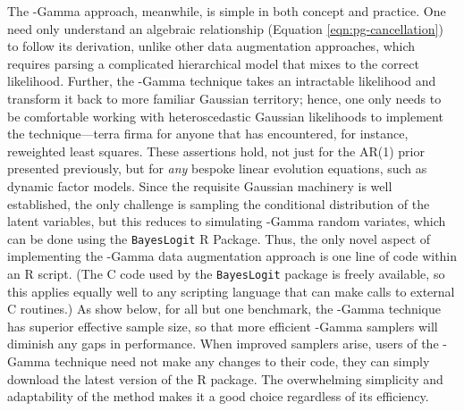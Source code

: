 The \Polya-Gamma approach, meanwhile, is simple in both concept and practice.
One need only understand an algebraic relationship (Equation
\ref{eqn:pg-cancellation}) to follow its derivation, unlike other data
augmentation approaches, which requires parsing a complicated hierarchical model
that mixes to the correct likelihood.  Further, the \Polya-Gamma technique takes
an intractable likelihood and transform it back to more familiar Gaussian
territory; hence, one only needs to be comfortable working with heteroscedastic
Gaussian likelihoods to implement the technique---terra firma for anyone that
has encountered, for instance, reweighted least squares.  These assertions hold,
not just for the AR(1) prior presented previously, but for \emph{any} bespoke
linear evolution equations, such as dynamic factor models.  Since the requisite
Gaussian machinery is well established, the only challenge is sampling the
conditional distribution of the latent variables, but this reduces to simulating
\Polya-Gamma random variates, which can be done using the \texttt{BayesLogit} R
Package.  Thus, the only novel aspect of implementing the \Polya-Gamma data
augmentation approach is one line of code within an R script.  (The C code used
by the \texttt{BayesLogit} package is freely available, so this applies equally
well to any scripting language that can make calls to external C routines.)  As
show below, for all but one benchmark, the \Polya-Gamma technique has superior
effective sample size, so that more efficient \Polya-Gamma samplers will
diminish any gaps in performance.  When improved samplers arise, users of the
\Polya-Gamma technique need not make any changes to their code, they can simply
download the latest version of the R package.  The overwhelming simplicity and
adaptability of the method makes it a good choice regardless of its efficiency.




